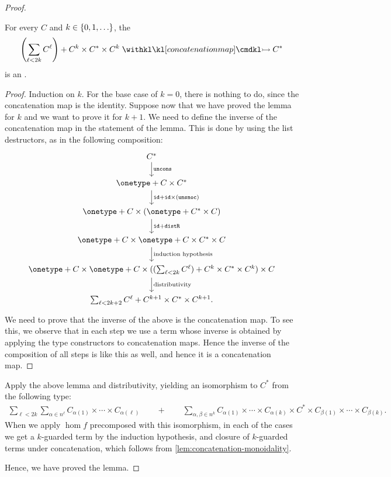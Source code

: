 \begin{proof}
\begin{description}
\begin{lemma}\label{lem:fixed-lengths-extracted}
    For every  $C$ and $k \in \{0,1,\ldots\}$, the 
        \begin{align*}
    \left(\sum_{\ell < 2k} C^\ell \right) +  C^k \times C^* \times C^k \concmap C^*
    \end{align*}
    is an .
\end{lemma}
\begin{proof}
    Induction on $k$. For the base case of $k=0$, there is nothing to do, since the concatenation map is the identity. 
    Suppose now that we have proved the lemma for $k$ and we want to prove it for $k+1$. We need to define the inverse of the concatenation map in the statement of the lemma. This is done by using the  list destructors, as in the following composition:
    \[
    \begin{tikzcd}
    C^* 
    \ar[d, "\unconsterm"] 
    \\
    \onetype + C \times C^* 
    \ar[d, "\idterm + \idterm \times (\unsnocterm)"]
    \\
    \onetype  + C \times (\onetype + C^* \times C) 
    \ar[d,"\idterm + \distrterm"]
    \\
    \onetype + C \times \onetype + C \times C^* \times C
    \ar[d,"\text{induction hypothesis}"]
    \\
    \onetype + C \times \onetype + C \times (    (\sum_{\ell < 2k} C^\ell) +  C^k \times C^* \times C^k) \times C
    \ar[d,"\text{distributivity}"]
    \\
    \sum_{\ell < 2k+2} C^\ell + C^{k+1} \times C^* \times C^{k+1}.
    \end{tikzcd}
    \]
    We need to prove that the inverse of the above is the  concatenation map. To see this, we observe that in each step we use a term whose inverse is obtained by  applying the type constructors to concatenation maps. Hence the inverse of the composition of all steps is like this as well, and hence it is a concatenation map.  
\end{proof}

Apply the above lemma and   distributivity, yielding an isomorphism to $C^*$ from the following type:
\begin{align*}
\sum_{\ell < 2k} \sum_{\alpha \in n^\ell} C_{\alpha(1)} \times \cdots \times C_{\alpha(\ell)}
\qquad + \qquad 
\sum_{\alpha, \beta \in n^k} C_{\alpha(1)} \times \cdots \times C_{\alpha(k)} \times C^* \times C_{\beta(1)} \times \cdots \times C_{\beta(k)}.
\end{align*}
When we apply $\hom f$ precomposed with this isomorphism, in each of the cases we get  a $k$-guarded term by the induction hypothesis, and closure of $k$-guarded terms under concatenation, which follows from \cref{lem:concatenation-monoidality}.
    \end{description}
Hence, we have proved the lemma. 
\end{proof}

